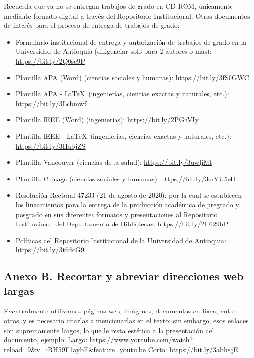 Recuerda que ya no se entregan trabajos de grado en CD-ROM, únicamente mediante formato digital a través del Repositorio Institucional. Otros documentos de interés para el proceso de entrega de trabajos de grado:

\begin{itemize}
    \item  Formulario institucional de entrega y autorización de trabajos de grado en la Universidad de Antioquia (diligenciar solo para 2 autores o más): \url{https://bit.ly/2Q0sc9P}  
    \item  Plantilla APA (Word) (ciencias sociales y humanas): \url{https://bit.ly/3fS0GWC} 
     \item Plantilla APA - \LaTeX \ (ingenierías, ciencias exactas y naturales, etc.): \url{https://bit.ly/3Lebmwf}
    \item  Plantilla IEEE (Word) (ingenierías):\url{ https://bit.ly/2PGnVIy} 
    \item Plantilla IEEE - \LaTeX \ (ingenierías, ciencias exactas y naturales, etc.): \url{https://bit.ly/3HubjZS}
    \item  Plantilla Vancouver (ciencias de la salud): \url{https://bit.ly/3uwljMt}  
    \item  Plantilla Chicago (ciencias sociales y humanas): \url{https://bit.ly/3mYU5eH} 
    \item  Resolución Rectoral 47233 (21 de agosto de 2020): por la cual se establecen los lineamientos para la entrega de la producción académica de pregrado y posgrado en sus diferentes formatos y presentaciones al Repositorio Institucional del Departamento de Bibliotecas: \url{https://bit.ly/2R629hP} 
    \item  Políticas del Repositorio Institucional de la Universidad de Antioquia: \url{https://bit.ly/3t6dcG9} 
\end{itemize}


\subsection*{Anexo B. Recortar y abreviar direcciones web largas}

Eventualmente utilizamos páginas web, imágenes, documentos en línea, entre otros, y es necesario citarlas o mencionarlas en el texto; sin embargo, esos enlaces son supremamente largos, lo que le resta estética a la presentación del documento, ejemplo:\newline
Largo: \url{https://www.youtube.com/watch?reload=9&v=tRH59E1aybE&feature=youtu.be}\newline
Corto: \url{https://bit.ly/3abhsgE}

